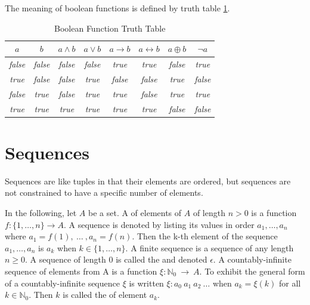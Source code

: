 The meaning of boolean functions is defined by truth table \ref{booleantt}.

\begin{table}[htp]
\caption{Boolean Function Truth Table}
\begin{center}
\begin{tabular}{|c|c||c|c|c|c|c|c|}
\hline
$a$ & $b$ & $a\wedge b$ & $a\vee b$ & $a\rightarrow b$ & $a\leftrightarrow b$ & $a\oplus b$ & $\neg a$ \\  \hline 
\emph{false} & \emph{false} & \emph{false} & \emph{false} & \emph{true} & \emph{true} & \emph{false} &  \emph{true}  \\ \hline 
\emph{true} & \emph{false} & \emph{false} & \emph{true} & \emph{false} & \emph{false} & \emph{true} & \emph{false}   \\ \hline 
\emph{false} & \emph{true} & \emph{false} & \emph{true} & \emph{true} & \emph{false} & \emph{true} &  \emph{true}  \\ \hline 
\emph{true} & \emph{true} & \emph{true} & \emph{true} & \emph{true} & \emph{true} & \emph{false} &  \emph{false}  \\ \hline 
\end{tabular}
\end{center}
\label{booleantt}
\end{table}%

\section{Sequences}\label{sec:informal_sequences}

\pn Sequences are like tuples in that their elements are ordered, but sequences are not constrained to have a specific number of elements.

\pn In the following, let $A$ be a set.  A  of elements of $A$ of length $n>0$ is a function
\(f:\{1,\ldots,n\} \rightarrow A\).  
A sequence is denoted by listing its values in order
\(a_1,\ldots,a_n\)
where $a_1=f(1),~\ldots~, a_n=f(n)$.  Then the k-th element of the sequence $a_1,\ldots,a_n$ is $a_k$ when 
$k\in\{1,\ldots,n\}$.  A finite sequence is a sequence of any length $n\ge0$.
A sequence of length 0 is called the  and denoted $\epsilon$.
A countably-infinite sequence of elements from A is a function $\xi:\mathbb{N}_0~\rightarrow~A$.
To exhibit the general form of a countably-infinite sequence $\xi$ is written
\(\xi:a_0~a_1~a_2~\ldots\)
when $a_k=\xi(k)$ for all $k\in\mathbb{N}_0$.  Then $k$ is called the  of element $a_k$.

